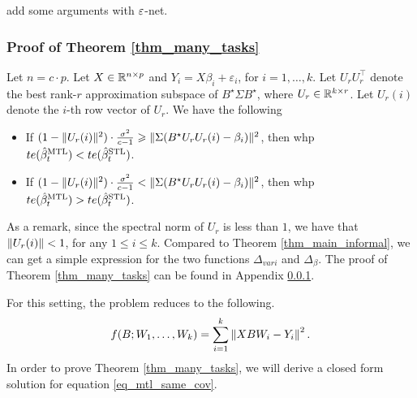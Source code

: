 {\cor add some arguments with ${\varepsilon}$-net.}


\subsubsection{Proof of Theorem \ref{thm_many_tasks}}\label{app_proof_many_tasks}

\begin{theorem}\label{thm_many_tasks}
	Let $n = c \cdot p$.
	Let $X\in\mathbb{R}^{n\times p}$ and $Y_i = X\beta_i + \varepsilon_i$, for $i = 1,\dots,k$.
	Let $U_r U_r^{\top}$ denote the best rank-$r$ approximation subspace of $B^{\star}\Sigma B^{\star}$, where $U_r\in\mathbb{R}^{k\times r}$.
	Let $U_r(i)$ denote the $i$-th row vector of $U_r$.
	We have the following
	\begin{itemize}
		\item If $(1 - \|U_r(i)\|^2)\cdot \frac{\sigma^2}{c - 1} \geqslant \|\Sigma (B^{\star} U_r U_r(i) - \beta_i)\|^2$, then whp $te(\hat{\beta}_t^{\text{MTL}}) < te(\hat{\beta}_t^{\text{STL}})$.
		\item If $(1 - \|U_r(i)\|^2)\cdot \frac{\sigma^2}{c - 1} < \|\Sigma(B^{\star} U_r U_r(i) - \beta_i)\|^2$, then whp $te(\hat{\beta}_t^{\text{MTL}}) > te(\hat{\beta}_t^{\text{STL}})$.
	\end{itemize}
\end{theorem}
As a remark, since the spectral norm of $U_r$ is less than $1$, we have that $\|U_r(i)\| < 1$, for any $1 \le i \le k$. Compared to Theorem \ref{thm_main_informal}, we can get a simple expression for the two functions $\Delta_{vari}$ and $\Delta_{\beta}$. The proof of Theorem \ref{thm_many_tasks} can be found in Appendix \ref{app_proof_many_tasks}.




For this setting, the problem reduces to the following.
\begin{align}
	f(B; W_1, \dots, W_k) = \sum_{i=1}^k \left\| X B W_i - Y_i \right\|^2. \label{eq_mtl_same_cov}
\end{align}
In order to prove Theorem \ref{thm_many_tasks}, we will derive a closed form solution for equation \eqref{eq_mtl_same_cov}.

